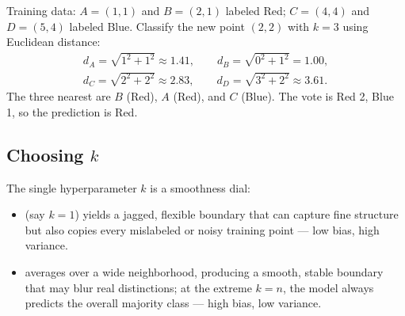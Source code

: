 \begin{mlfigure}
\end{mlfigure}

\begin{workedexample}
Training data: $A=(1,1)$ and $B=(2,1)$ labeled Red; $C=(4,4)$ and $D=(5,4)$ labeled Blue. Classify the new point $(2,2)$ with $k=3$ using Euclidean distance:
\begin{gather*}
  d_A=\sqrt{1^2+1^2}\approx 1.41,\qquad
  d_B=\sqrt{0^2+1^2}=1.00,\\
  d_C=\sqrt{2^2+2^2}\approx 2.83,\qquad
  d_D=\sqrt{3^2+2^2}\approx 3.61.
\end{gather*}
The three nearest are $B$ (Red), $A$ (Red), and $C$ (Blue). The vote is Red 2, Blue 1, so the prediction is Red.
\end{workedexample}

\subsection{Choosing $k$}

The single hyperparameter $k$ is a smoothness dial:

\begin{itemize}
  \item {} (say $k=1$) yields a jagged, flexible boundary that can capture fine structure but also copies every mislabeled or noisy training point --- low bias, high variance.
  \item {} averages over a wide neighborhood, producing a smooth, stable boundary that may blur real distinctions; at the extreme $k=n$, the model always predicts the overall majority class --- high bias, low variance.
\end{itemize}

